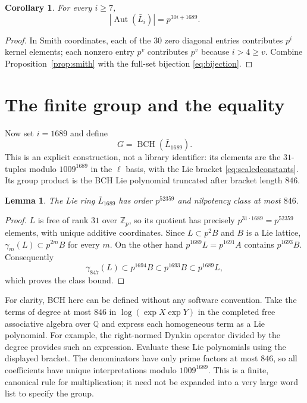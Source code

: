 \documentclass[11pt]{article}
\newtheorem{lemma}[theorem]{Lemma}
\newtheorem{corollary}[theorem]{Corollary}
\theoremstyle{definition}\newtheorem{definition}[theorem]{Definition}
\theoremstyle{remark}\newtheorem{remark}[theorem]{Remark}
\DeclareMathOperator{\Aut}{Aut}
\DeclareMathOperator{\BCH}{BCH}
\newcommand{\Zp}{\mathbb Z_p}
\begin{document}
\begin{corollary}\label{cor:autLie}
For every $i\ge7$,
\begin{equation}\label{eq:autLie}
 |\Aut(\bar L_i)|=p^{30i+1689}.
\end{equation}
\end{corollary}
\begin{proof}
In Smith coordinates, each of the $30$ zero diagonal entries contributes
$p^i$ kernel elements; each nonzero entry $p^v$ contributes $p^v$ because
$i>4\ge v$. Combine Proposition~\ref{prop:smith} with the full-set
bijection \eqref{eq:bijection}.
\end{proof}

\section{The finite group and the equality}
Now set $i=1689$ and define
\begin{equation}\label{eq:G}
 G=\BCH(\bar L_{1689}).
\end{equation}
This is an explicit construction, not a library identifier: its elements
are the $31$-tuples modulo $1009^{1689}$ in the $\ell$ basis, with the Lie
bracket \eqref{eq:scaledconstants}. Its group product is the BCH Lie
polynomial truncated after bracket length $846$.

\begin{lemma}\label{lem:class}
The Lie ring $\bar L_{1689}$ has order $p^{52359}$ and nilpotency class
at most $846$.
\end{lemma}
\begin{proof}
$L$ is free of rank $31$ over $\Zp$, so its quotient has precisely
$p^{31\cdot1689}=p^{52359}$ elements, with unique additive coordinates.
Since $L\subset p^2B$ and $B$ is a Lie lattice,
$\gamma_m(L)\subset p^{2m}B$ for every $m$.
On the other hand $p^{1689}L=p^{1691}A$ contains $p^{1693}B$.
Consequently
\[
 \gamma_{847}(L)\subset p^{1694}B\subset p^{1693}B
 \subset p^{1689}L,
\]
which proves the class bound.
\end{proof}

For clarity, BCH here can be defined without any software convention.
Take the terms of degree at most $846$ in
$\log(\exp X\exp Y)$ in the completed free associative algebra over
$\mathbb Q$ and express each homogeneous term as a Lie polynomial.
For example, the right-normed Dynkin operator divided by the degree
provides such an expression. Evaluate these Lie polynomials using the
displayed bracket. The denominators have only prime factors at most $846$,
so all coefficients have unique interpretations modulo $1009^{1689}$.
This is a finite, canonical rule for multiplication; it need not be expanded
into a very large word list to specify the group.
\end{document}

